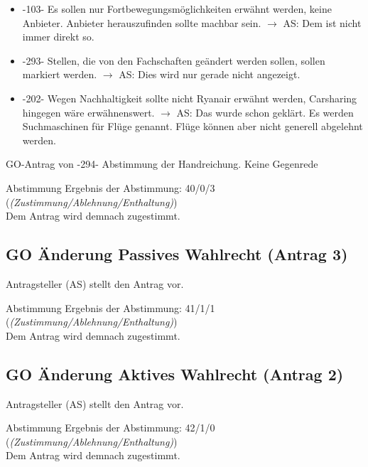     \begin{itemize}
      \item -103- Es sollen nur Fortbewegungsmöglichkeiten erwähnt werden, keine Anbieter. Anbieter herauszufinden sollte machbar sein. $\rightarrow$ AS: Dem ist nicht immer direkt so.
      \item -293- Stellen, die von den Fachschaften geändert werden sollen, sollen markiert werden.
        $\rightarrow$ AS: Dies wird nur gerade nicht angezeigt.
      \item -202- Wegen Nachhaltigkeit sollte nicht Ryanair erwähnt werden, Carsharing hingegen wäre erwähnenswert.
        $\rightarrow$ AS: Das wurde schon geklärt. Es werden Suchmaschinen für Flüge genannt. Flüge können aber nicht generell abgelehnt werden.
    \end{itemize}

    \begin{danger}{GO-Antrag von -294-}
      Abstimmung der Handreichung. Keine Gegenrede
    \end{danger}

    \begin{success}{Abstimmung}
      Ergebnis der Abstimmung: 40/0/3 (\textit{(Zustimmung/Ablehnung/Enthaltung)}) \\
      Dem Antrag wird demnach zugestimmt.
    \end{success}

  \subsection{GO Änderung Passives Wahlrecht (Antrag 3)}
    Antragsteller (AS) stellt den Antrag vor.

    \begin{success}{Abstimmung}
      Ergebnis der Abstimmung: 41/1/1 (\textit{(Zustimmung/Ablehnung/Enthaltung)}) \\
      Dem Antrag wird demnach zugestimmt.
    \end{success}

  \subsection{GO Änderung Aktives Wahlrecht (Antrag 2)}
    Antragsteller (AS) stellt den Antrag vor.

    \begin{success}{Abstimmung}
      Ergebnis der Abstimmung: 42/1/0 (\textit{(Zustimmung/Ablehnung/Enthaltung)}) \\
      Dem Antrag wird demnach zugestimmt.
    \end{success}

